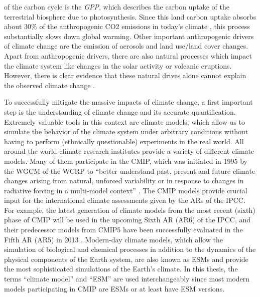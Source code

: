 of the carbon cycle is the \emph{\ac{GPP}}, which describes the carbon uptake
of the terrestrial biosphere due to photosynthesis. Since this land carbon
uptake absorbs about $30 \unit{\%}$ of the anthropogenic \ac{CO2} emissions in
today's climate \autocite{Friedlingstein2020}, this process substantially slows
down global warming. Other important anthropogenic drivers of climate change
are the emission of aerosols and land use/land cover changes. Apart from
anthropogenic drivers, there are also natural processes which impact the
climate system like changes in the solar activity or volcanic eruptions.
However, there is clear evidence that these natural drives alone cannot explain
the observed climate change \autocite{Haustein2017}.

To successfully mitigate the massive impacts of climate change, a first
important step is the understanding of climate change and its accurate
quantification. Extremely valuable tools in this context are climate models,
which allow us to simulate the behavior of the climate system under arbitrary
conditions without having to perform (ethnically questionable) experiments in
the real world. All around the world climate research institutes provide a
variety of different climate models. Many of them participate in the \ac{CMIP},
which was initiated in 1995 by the \ac{WGCM} of the \ac{WCRP} to
\enquote{better understand past, present and future climate changes arising
  from natural, unforced variability or in response to changes in radiative
  forcing in a multi-model context} \autocite{WCRP2020}. The \ac{CMIP} models
provide crucial input for the international climate assessments given by the
\acp{AR} of the \ac{IPCC}. For example, the latest generation of climate models
from the most recent (sixth) phase of \ac{CMIP}  will be used in the upcoming Sixth \acl{AR} (\acs{AR}6) of
the \ac{IPCC}, and their predecessor models from \acs{CMIP}5
\autocite{Taylor2012} have been successfully evaluated in the Fifth \acl{AR}
(\acs{AR}5) in 2013 \autocite{Flato2013}. Modern-day climate models, which
allow the simulation of biological and chemical processes in addition to the
dynamics of the physical components of the Earth system, are also known as
\acp{ESM} and provide the most sophisticated simulations of the Earth's
climate. In this thesis, the terms \enquote{climate model} and
\enquote{\acl{ESM}} are used interchangeably since most modern models
participating in \ac{CMIP} are \acp{ESM} or at least have \ac{ESM} versions.

